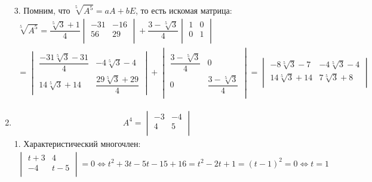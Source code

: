 \begin{enumerate}
				3. Помним, что $\sqrt[5]{A^{5}} = aA + bE$, то есть искомая матрица:
				\begin{gather*}
					\sqrt[5]{A^{5}} = 
					\dfrac{\sqrt[5]{3} + 1}{4} 
					\begin{vmatrix} 
						-31 & -16\\ 
						56 & 29\\ 
					\end{vmatrix} 
					+ \dfrac{3 - \sqrt[5]{3}}{4} 
					\begin{vmatrix} 
						1 & 0\\
						0 & 1\\ 
					\end{vmatrix}
					\\
					= 
					\begin{vmatrix} 
						\dfrac{-31 \sqrt[5]{3} - 31}{4} & -4\sqrt[5]{3} - 4\\
						14 \sqrt[5]{3} + 14 & \dfrac{29 \sqrt[5]{3} + 29}{4} 
					\end{vmatrix}
					+
					\begin{vmatrix} 
						\\ 
						\dfrac{3 - \sqrt[5]{3}}{4} & 0\\
						0 & \dfrac{3 - \sqrt[5]{3}}{4}\\
					\end{vmatrix}
					=
					\begin{vmatrix}
						-8\sqrt[5]{3} - 7 & -4\sqrt[5]{3} - 4\\
						14\sqrt[5]{3} + 14 & 7\sqrt[5]{3} + 8\\
					\end{vmatrix}
				\end{gather*}
				
			\item
				\begin{gather*}
					A^{4} = 
					\begin{vmatrix} 
						-3 & -4\\
						4 & 5\\
					\end{vmatrix}
				\end{gather*}
				1. Характеристический многочлен:
				\begin{gather*}
					\begin{vmatrix} 
						t + 3 & 4\\
						- 4 & t - 5\\
					\end{vmatrix}
					= 0 \Leftrightarrow 
					t^{2} + 3t - 5t - 15 + 16 = t^{2} - 2t + 1 = (t - 1)^{2} = 0 \Leftrightarrow 
					t = 1
				\end{gather*}
				

\end{enumerate}
